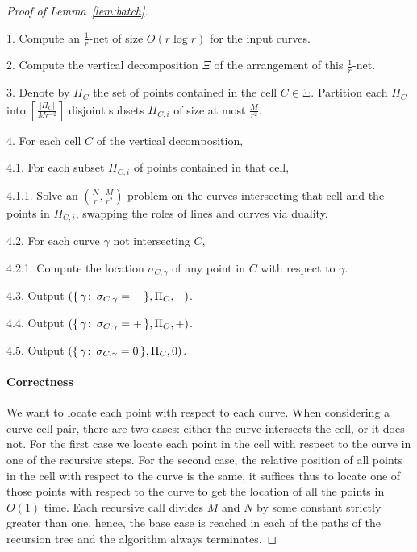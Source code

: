 \begin{proof}[Proof of Lemma~\ref{lem:batch}]
\begin{algorithm}
\item[1.] Compute an $\frac 1r$-net of size $O(r \log r)$ for the input curves.
\item[2.] Compute the vertical decomposition \(\Xi\) of the arrangement of this
    $\frac 1r$-net.
\item[3.] Denote by \(\Pi_C\) the set of points contained in the cell \(C \in \Xi\).
    Partition each \(\Pi_C\) into \(\left\lceil \frac{\lvert \Pi_C \rvert}{M
    r^{-2}} \right\rceil\) disjoint subsets
    $\Pi_{C,i}$ of size at most \(\frac{M}{r^2}\).
\item[4.] For each cell $C$ of the vertical decomposition,
\item[4.1.] For each subset $\Pi_{C,i}$ of points contained in that cell,
\item[4.1.1.] Solve an $(\frac{N}{r},\frac{M}{r^2})$-problem on the curves
    intersecting that cell and the points in $\Pi_{C,i}$, swapping the roles of
    lines and curves via duality.
\item[4.2.] For each curve $\gamma$ not intersecting $C$,
\item[4.2.1.] Compute the location $\sigma_{C,\gamma}$ of any point in $C$ with
    respect to $\gamma$.
\item[4.3.] Output $(\{\,\gamma \colon\, \sigma_{C,\gamma} = -\,\},\Pi_C, -)$.
\item[4.4.] Output $(\{\,\gamma \colon\, \sigma_{C,\gamma} = +\,\},\Pi_C, +)$.
\item[4.5.] Output $(\{\,\gamma \colon\, \sigma_{C,\gamma} = 0\,\},\Pi_C, 0)$.
\end{algorithm}

\paragraph{Correctness} We want to locate each point with respect to each
curve. When considering a curve-cell pair, there are two cases: either the
curve intersects the cell, or it does not. For the first case we locate
each point in the cell with respect to the curve in one of the recursive steps.
For the second case, the relative position of all points in the cell with
respect to the curve is the same, it suffices thus to locate one of those points
with respect to the curve to get the location of all the points in
$O(1)$ time.
Each recursive call divides $M$ and
$N$ by some constant strictly greater than one, hence, the base case is reached
in each of the paths of the recursion tree and the algorithm always terminates.


\end{proof}

